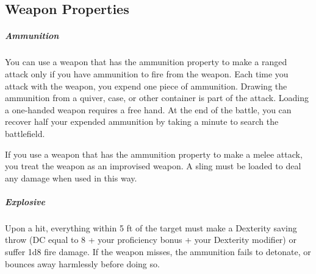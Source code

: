 

\subsection*{Weapon Properties} \label{ssec::weaponproperties}
    \subparagraph{Ammunition} You can use a weapon that has the ammunition property to make a ranged attack only if you have ammunition to fire from the weapon.
    Each time you attack with the weapon, you expend one piece of ammunition.
    Drawing the ammunition from a quiver, case, or other container is part of the attack.
    Loading a one-handed weapon requires a free hand.
    At the end of the battle, you can recover half your expended ammunition by taking a minute to search the battlefield.

    If you use a weapon that has the ammunition property to make a melee attack, you treat the weapon as an improvised weapon.
    A sling must be loaded to deal any damage when used in this way.

    \subparagraph{Explosive} Upon a hit, everything within 5 ft of the target must make a Dexterity saving throw (DC equal to 8 + your proficiency bonus + your Dexterity modifier) or suffer 1d8 fire damage.
    If the weapon misses, the ammunition fails to detonate, or bounces away harmlessly before doing so.

